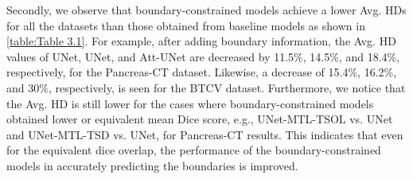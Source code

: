 \documentclass[final,5p,times,twocolumn]{elsarticle}
\begin{document}
Secondly, we observe that boundary-constrained models achieve a lower Avg. HDs for all the datasets than those obtained from baseline models as shown in \autoref{table:Table 3.1}. For example, after adding boundary information, the Avg. HD values of UNet, UNet, and Att-UNet are decreased by 11.5\%, 14.5\%, and 18.4\%, respectively, for the Pancreas-CT dataset. Likewise, a decrease of 15.4\%, 16.2\%, and 30\%, respectively, is seen for the BTCV dataset. Furthermore, we notice that the Avg. HD is still lower for the cases where boundary-constrained models obtained lower or equivalent mean Dice score, e.g., UNet-MTL-TSOL vs. UNet and UNet-MTL-TSD vs. UNet, for Pancreas-CT results. This indicates that even for the equivalent dice overlap, the performance of the boundary-constrained models in accurately predicting the boundaries is improved.
\end{document}
